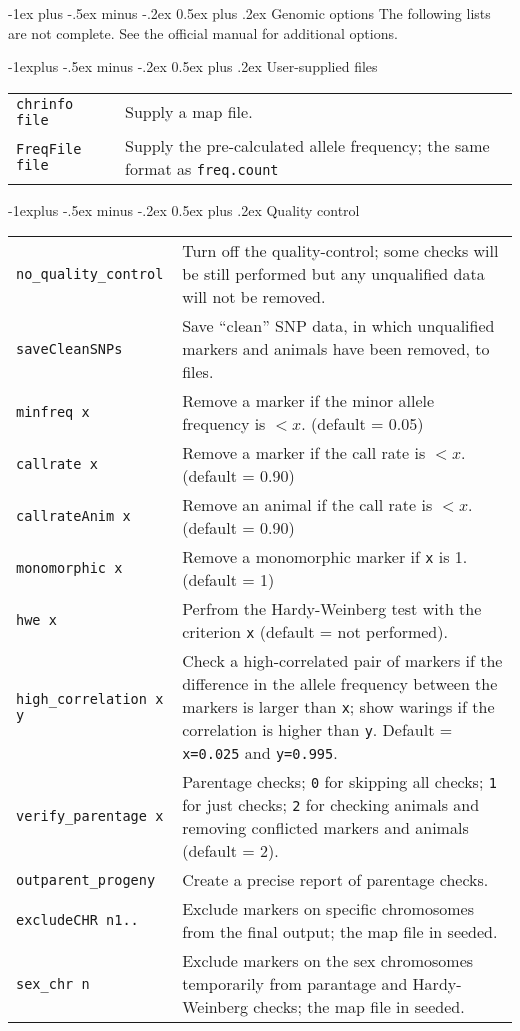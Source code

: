 \documentclass[10pt,landscape]{article}
\makeatletter
\renewcommand{\section}{\@startsection{section}{1}{0mm}%
                                {-1ex plus -.5ex minus -.2ex}%
                                {0.5ex plus .2ex}%
                                {\normalfont\large\bfseries}}
\renewcommand{\subsection}{\@startsection{subsection}{2}{0mm}%
                                {-1explus -.5ex minus -.2ex}%
                                {0.5ex plus .2ex}%
                                {\normalfont\normalsize\bfseries}}
\makeatother
\begin{document}
\begin{multicols}{3}
\section{Genomic options}
The following lists are not complete.
See the official manual for additional options.

\subsection{User-supplied files}
\begin{tabular}{@{}lp{16em}@{}}
  \verb|chrinfo file| & Supply a map file.\\
  \verb|FreqFile file| & Supply the pre-calculated allele frequency; the same format as \verb|freq.count|\\
\end{tabular}

\subsection{Quality control}
\begin{tabular}{@{}lp{16em}@{}}
  \verb|no_quality_control| & Turn off the quality-control; some checks will be still performed but any unqualified data will not be removed.\\
  \verb|saveCleanSNPs| & Save ``clean'' SNP data, in which unqualified markers and animals have been removed, to files.\\
  \verb|minfreq x| & Remove a marker if the minor allele frequency is $<x$. (default = 0.05)\\
  \verb|callrate x| & Remove a marker if the call rate is $<x$. (default = 0.90)\\
  \verb|callrateAnim x| & Remove an animal if the call rate is $<x$. (default = 0.90)\\
  \verb|monomorphic x| & Remove a monomorphic marker if \verb|x| is 1. (default = 1)\\
  \verb|hwe x| & Perfrom the Hardy-Weinberg test with the criterion \verb|x| (default = not performed).\\
  \verb|high_correlation x y| & Check a high-correlated pair of markers if the difference in the allele frequency between the markers is larger than \verb|x|; show warings if the correlation is higher than \verb|y|. Default = \verb|x=0.025| and \verb|y=0.995|.\\
  \verb|verify_parentage x| & Parentage checks; \verb|0| for skipping all checks; \verb|1| for just checks; \verb|2| for checking animals and removing conflicted markers and animals (default = 2).\\
  \verb|outparent_progeny| & Create a precise report of parentage checks.\\
  \verb|excludeCHR n1..| & Exclude markers on specific chromosomes from the final output; the map file in seeded.\\
  \verb|sex_chr n| & Exclude markers on the sex chromosomes temporarily from parantage and Hardy-Weinberg checks; the map file in seeded.\\
\end{tabular}


\end{multicols}
\end{document}
